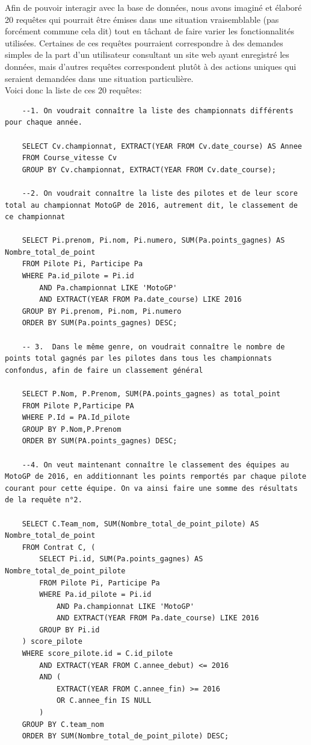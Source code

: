 \documentclass[12pt,a4paper]{article}
\newenvironment{code}{\captionsetup{type=listing}}{}
\begin{document}
Afin de pouvoir interagir avec la base de données, nous avons imaginé et élaboré 20 requêtes qui pourrait être émises dans une situation vraisemblable (pas forcément commune cela dit) tout en tâchant de faire varier les fonctionnalités utilisées. Certaines de ces requêtes pourraient correspondre à des demandes simples de la part d'un utilisateur consultant un site web ayant enregistré les données, mais d'autres requêtes correspondent plutôt à des actions uniques qui seraient demandées dans une situation particulière.
\\Voici donc la liste de ces 20 requêtes:
\\
\begin{code}
    \begin{verbatim}
    --1. On voudrait connaître la liste des championnats différents pour chaque année.
    
    SELECT Cv.championnat, EXTRACT(YEAR FROM Cv.date_course) AS Annee
    FROM Course_vitesse Cv
    GROUP BY Cv.championnat, EXTRACT(YEAR FROM Cv.date_course);
    
    --2. On voudrait connaître la liste des pilotes et de leur score total au championnat MotoGP de 2016, autrement dit, le classement de ce championnat

    SELECT Pi.prenom, Pi.nom, Pi.numero, SUM(Pa.points_gagnes) AS Nombre_total_de_point
    FROM Pilote Pi, Participe Pa
    WHERE Pa.id_pilote = Pi.id
        AND Pa.championnat LIKE 'MotoGP'
        AND EXTRACT(YEAR FROM Pa.date_course) LIKE 2016
    GROUP BY Pi.prenom, Pi.nom, Pi.numero
    ORDER BY SUM(Pa.points_gagnes) DESC;
    
    -- 3.  Dans le même genre, on voudrait connaître le nombre de points total gagnés par les pilotes dans tous les championnats confondus, afin de faire un classement général
    
    SELECT P.Nom, P.Prenom, SUM(PA.points_gagnes) as total_point
    FROM Pilote P,Participe PA
    WHERE P.Id = PA.Id_pilote
    GROUP BY P.Nom,P.Prenom
    ORDER BY SUM(PA.points_gagnes) DESC;
    
    --4. On veut maintenant connaître le classement des équipes au MotoGP de 2016, en additionnant les points remportés par chaque pilote courant pour cette équipe. On va ainsi faire une somme des résultats de la requête n°2.

    SELECT C.Team_nom, SUM(Nombre_total_de_point_pilote) AS Nombre_total_de_point
    FROM Contrat C, (
        SELECT Pi.id, SUM(Pa.points_gagnes) AS Nombre_total_de_point_pilote
        FROM Pilote Pi, Participe Pa
        WHERE Pa.id_pilote = Pi.id
            AND Pa.championnat LIKE 'MotoGP'
            AND EXTRACT(YEAR FROM Pa.date_course) LIKE 2016
        GROUP BY Pi.id
    ) score_pilote
    WHERE score_pilote.id = C.id_pilote
        AND EXTRACT(YEAR FROM C.annee_debut) <= 2016
        AND (
            EXTRACT(YEAR FROM C.annee_fin) >= 2016
            OR C.annee_fin IS NULL
        )
    GROUP BY C.team_nom
    ORDER BY SUM(Nombre_total_de_point_pilote) DESC;
    

\end{verbatim}
\end{code}
\end{document}
